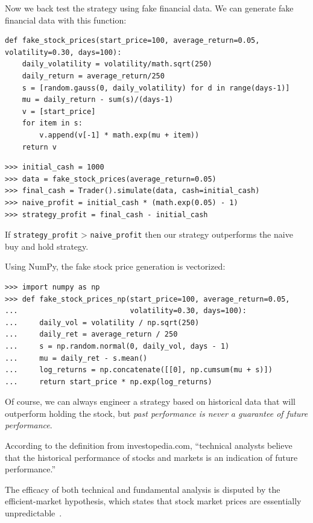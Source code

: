 \documentclass[justified, sixbynine]{tufte-book}
\def\ft{\small\tt}
\theoremstyle{plain}%
\newtheorem * {corollary}{Corollary}
\theoremstyle{definition}
\theoremstyle{remark}
\newtheorem * {remark}{Remark}
\newtheorem * {note}{Note}
\begin{document}
\begin{fullwidth}
Now we back test the strategy using fake financial data. We can generate fake financial data with this function:

\begin{lstlisting}[caption={in file: {\ft nlib.py}}]
def fake_stock_prices(start_price=100, average_return=0.05, volatility=0.30, days=100):
    daily_volatility = volatility/math.sqrt(250)
    daily_return = average_return/250
    s = [random.gauss(0, daily_volatility) for d in range(days-1)]
    mu = daily_return - sum(s)/(days-1)
    v = [start_price]
    for item in s:
        v.append(v[-1] * math.exp(mu + item))
    return v
\end{lstlisting}

\begin{lstlisting}[caption={in file: {\ft nlib.py}}]
>>> initial_cash = 1000
>>> data = fake_stock_prices(average_return=0.05) 
>>> final_cash = Trader().simulate(data, cash=initial_cash)
>>> naive_profit = initial_cash * (math.exp(0.05) - 1)
>>> strategy_profit = final_cash - initial_cash
\end{lstlisting}

If {\ft strategy\_profit} > {\ft naive\_profit} then our strategy outperforms the naive buy and hold strategy.

Using NumPy, the fake stock price generation is vectorized:

\begin{lstlisting}
>>> import numpy as np
>>> def fake_stock_prices_np(start_price=100, average_return=0.05,
...                          volatility=0.30, days=100):
...     daily_vol = volatility / np.sqrt(250)
...     daily_ret = average_return / 250
...     s = np.random.normal(0, daily_vol, days - 1)
...     mu = daily_ret - s.mean()
...     log_returns = np.concatenate([[0], np.cumsum(mu + s)])
...     return start_price * np.exp(log_returns)
\end{lstlisting}

Of course, we can always engineer a strategy based on historical data that will outperform holding the stock, but {\it past performance is never a guarantee of future performance}.

According to the definition from investopedia.com, ``technical analysts believe that the historical performance of stocks and markets is an indication of future performance.''

The efficacy of both technical and fundamental analysis is disputed by the efficient-market hypothesis, which states that stock market prices are essentially unpredictable~\cite{andrew}.


\end{fullwidth}
\end{document}
